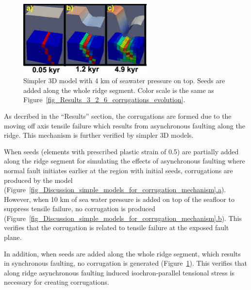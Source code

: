 \begin{figure}[h]
  \centering
    \includegraphics[width=0.6\textwidth]{./Figures/fig_Discussion_Observation_6_Corrugation_simplerModel_4kwaterdepth_along_ridge_seed.eps}
  \caption[Simpler 3D model with 4 km of seawater pressure on top. Seeds are added along the whole ridge segment.]{Simpler 3D model with 4 km of seawater pressure on top. Seeds are added along the whole ridge segment. Color scale is the same as Figure~\hyperref[fig_Results_3_2_6_corrugations_evolution]{\ref{fig_Results_3_2_6_corrugations_evolution}}.}
 \label{fig_Discussion_Observation_6_Corrugation_simplerModel_4kwaterdepth_along_ridge_seed}
\end{figure}   

As decribed in the ``Results'' section, the corrugations are formed due to the moving off axis tensile failure which results from asynchronous faulting along the ridge. This mechanism is further verified by simpler 3D models.

When seeds (elements with prescribed plastic strain of 0.5) are partially added along the ridge segment for simulating the effects of asynchronous faulting where normal fault initiates earlier at the region with initial seeds, corrugations are produced by the model (Figure~\hyperref[fig_Discussion_simple_models_for_corrugation_mechanism]{\ref{fig_Discussion_simple_models_for_corrugation_mechanism}.a}). 
However, when 10 km of sea water pressure is added on top of the seafloor to suppress tensile failure, no corrugation is produced (Figure~\hyperref[fig_Discussion_simple_models_for_corrugation_mechanism]{\ref{fig_Discussion_simple_models_for_corrugation_mechanism}.b}). This verifies that the corrugation is related to tensile failure at the exposed fault plane.

In addition, when seeds are added along the whole ridge segment, which results in synchronous faulting, no corrugation is generated (Figure~\hyperref[fig_Discussion_Observation_6_Corrugation_simplerModel_4kwaterdepth_along_ridge_seed]{\ref{fig_Discussion_Observation_6_Corrugation_simplerModel_4kwaterdepth_along_ridge_seed}}). This verifies that along ridge asynchronous faulting induced isochron-parallel tensional stress is necessary for creating corrugations.

